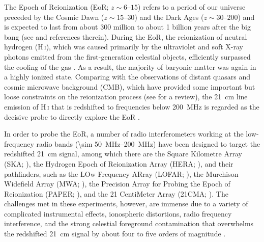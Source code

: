 \documentclass[twocolumn]{aastex62}
\newcommand{\Hi}{H\,\textsc{i}}
\begin{document}
The Epoch of Reionization (EoR; $z \sim \numrange{6}{15}$) refers to
a period of our universe preceded by the Cosmic Dawn
($z \sim \numrange{15}{30}$) and the Dark Ages ($z \sim \numrange{30}{200}$)
and is expected to last from about 300 million to about 1 billion years
after the big bang (see \citealt{koopmans2015rev} and references therein).
During the EoR, the reionization of neutral hydrogen (\Hi), which was
caused primarily by the ultraviolet and soft X-ray photons emitted from
the first-generation celestial objects, efficiently surpassed the cooling
of the gas \citep{dayal2018}.
As a result, the majority of baryonic matter was again in a highly ionized
state.
Comparing with the observations of distant quasars and cosmic microwave
background (CMB), which have provided some important but loose constraints
on the reionization process (see \citealt{fan2006rev} for a review),
the 21~cm line emission of \Hi{} that is redshifted to frequencies below
\SI{200}{\MHz} is regarded as the decisive probe to directly explore the EoR
\citep[see][for reviews]{furlanetto2006rev,zaroubi2013rev,furlanetto2016rev}.

In order to probe the EoR, a number of radio interferometers working
at the low-frequency radio bands (\SIrange{\sim 50}{200}{\MHz}) have been
designed to target the redshifted 21~cm signal, among which there are
the Square Kilometre Array (SKA; \citealt{mellema2013rev,koopmans2015rev}),
the Hydrogen Epoch of Reionization Array (HERA; \citealt{deboer2017}),
and their pathfinders, such as
the LOw Frequency ARray (LOFAR; \citealt{vanHaarlem2013}),
the Murchison Widefield Array (MWA; \citealt{bowman2013,tingay2013}),
the Precision Array for Probing the Epoch of Reionization
(PAPER; \citealt{parsons2010}),
and the 21 CentiMeter Array (21CMA; \citealt{zheng2016}).
The challenges met in these experiments, however, are immense
due to a variety of complicated instrumental effects,
ionospheric distortions, radio frequency interference, and the
strong celestial foreground contamination that overwhelms the
redshifted 21~cm signal by about four to five orders of magnitude
\citep[see][for a review]{morales2010rev}.
\end{document}
